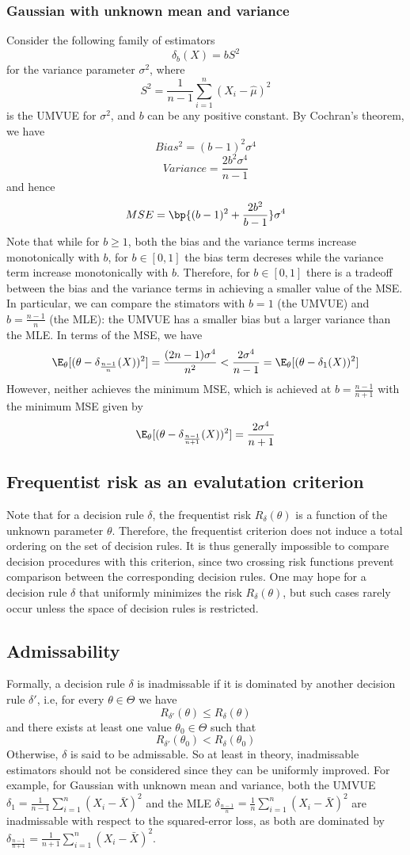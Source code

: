 \subsubsection{Gaussian with unknown mean and variance}
Consider the following family of estimators
\[
    \delta_b(X) = bS^2
\]
for the variance parameter $\sigma^2$, where
\[
    S^2 = \frac{1}{n-1}\sum_{i=1}^n (X_i - \hat{\mu})^2
\]
is the UMVUE for $\sigma^2$, and $b$ can be any positive constant. By Cochran's theorem, we have
\[
    Bias^2 = (b-1)^2 \sigma^4
\]
\[
    Variance = \frac{2b^2\sigma^4}{n-1}
\]
and hence
\[
    MSE = \bp{(b-1)^2 + \frac{2b^2}{b-1}} \sigma^4
\]
Note that while for $b\geq 1$, both the bias and the variance terms increase monotonically with $b$,
for $b\in[0,1]$ the bias term decreses while the variance term increase monotonically with $b$. Therefore, for $b\in[0,1]$
there is a tradeoff between the bias and the variance terms in achieving a smaller value of the MSE. In particular,
we can compare the stimators with $b=1$ (the UMVUE) and $b = \frac{n-1}{n}$ (the MLE): the UMVUE has a smaller bias but a larger
variance than the MLE. In terms of the MSE, we have
\[
    \E_\theta[(\theta - \delta_{\frac{n-1}{n}}(X))^2] = \frac{(2n-1)\sigma^4}{n^2} < \frac{2\sigma^4}{n-1} = \E_\theta[(\theta - \delta_1(X))^2]
\]
However, neither achieves the minimum MSE, which is achieved at $b = \frac{n-1}{n+1}$ with the minimum MSE given by
\[
    \E_\theta[(\theta - \delta_{\frac{n-1}{n+1}}(X))^2] = \frac{2\sigma^4}{n+1}
\]
\subsection{Frequentist risk as an evalutation criterion}
Note that for a decision rule $\delta$, the frequentist risk $R_\delta(\theta)$ is a function of the unknown parameter $\theta$. Therefore, the frequentist criterion
does not induce a total ordering on the set of decision rules. It is thus generally impossible to compare decision procedures with this criterion, since two crossing risk functions prevent comparison between the corresponding decision rules.
One may hope for a decision rule $\delta$ that uniformly minimizes the risk $R_\delta(\theta)$, but such cases rarely occur unless the space of decision rules is restricted.

\subsection{Admissability}
Formally, a decision rule $\delta$ is inadmissable if it is dominated by another decision rule $\delta'$, i.e, for every $\theta \in \Theta$ we have
\[
    R_{\delta'}(\theta) \leq R_\delta(\theta)
\]
and there exists at least one value $\theta_0 \in \Theta$ such that
\[
    R_{\delta'}(\theta_0) < R_\delta(\theta_0)
\]
Otherwise, $\delta$ is said to be admissable. So at least in theory, inadmissable estimators should not be
considered since they can be uniformly improved. For example, for Gaussian with unknown mean and variance, both the
UMVUE $\delta_1 = \frac{1}{n-1} \sum_{i=1}^n (X_i - \bar{X})^2$ and the MLE $\delta_{\frac{n-1}{n}} = \frac{1}{n} \sum_{i=1}^n(X_i - \bar{X})^2$ are inadmissable with
respect to the squared-error loss, as both are dominated by $\delta_{\frac{n-1}{n+1}} = \frac{1}{n+1} \sum_{i=1}^n (X_i - \bar{X})^2$.
